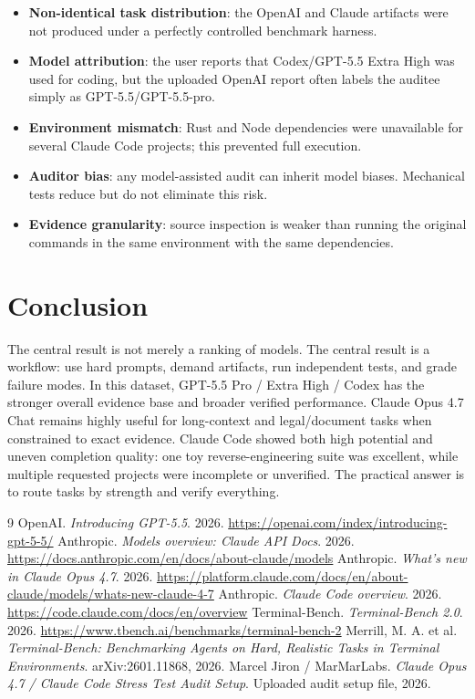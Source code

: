 \documentclass[11pt]{article}
\begin{document}
\begin{itemize}[leftmargin=*]
    \item \textbf{Non-identical task distribution}: the OpenAI and Claude artifacts were not produced under a perfectly controlled benchmark harness.
    \item \textbf{Model attribution}: the user reports that Codex/GPT-5.5 Extra High was used for coding, but the uploaded OpenAI report often labels the auditee simply as GPT-5.5/GPT-5.5-pro.
    \item \textbf{Environment mismatch}: Rust and Node dependencies were unavailable for several Claude Code projects; this prevented full execution.
    \item \textbf{Auditor bias}: any model-assisted audit can inherit model biases. Mechanical tests reduce but do not eliminate this risk.
    \item \textbf{Evidence granularity}: source inspection is weaker than running the original commands in the same environment with the same dependencies.
\end{itemize}

\section{Conclusion}

The central result is not merely a ranking of models. The central result is a workflow: use hard prompts, demand artifacts, run independent tests, and grade failure modes. In this dataset, GPT-5.5 Pro / Extra High / Codex has the stronger overall evidence base and broader verified performance. Claude Opus 4.7 Chat remains highly useful for long-context and legal/document tasks when constrained to exact evidence. Claude Code showed both high potential and uneven completion quality: one toy reverse-engineering suite was excellent, while multiple requested projects were incomplete or unverified. The practical answer is to route tasks by strength and verify everything.

\begin{thebibliography}{9}
 OpenAI. \emph{Introducing GPT-5.5}. 2026. \url{https://openai.com/index/introducing-gpt-5-5/}
 Anthropic. \emph{Models overview: Claude API Docs}. 2026. \url{https://docs.anthropic.com/en/docs/about-claude/models}
 Anthropic. \emph{What's new in Claude Opus 4.7}. 2026. \url{https://platform.claude.com/docs/en/about-claude/models/whats-new-claude-4-7}
 Anthropic. \emph{Claude Code overview}. 2026. \url{https://code.claude.com/docs/en/overview}
 Terminal-Bench. \emph{Terminal-Bench 2.0}. 2026. \url{https://www.tbench.ai/benchmarks/terminal-bench-2}
 Merrill, M. A. et al. \emph{Terminal-Bench: Benchmarking Agents on Hard, Realistic Tasks in Terminal Environments}. arXiv:2601.11868, 2026.
 Marcel Jiron / MarMarLabs. \emph{Claude Opus 4.7 / Claude Code Stress Test Audit Setup}. Uploaded audit setup file, 2026.
\end{thebibliography}
\end{document}
